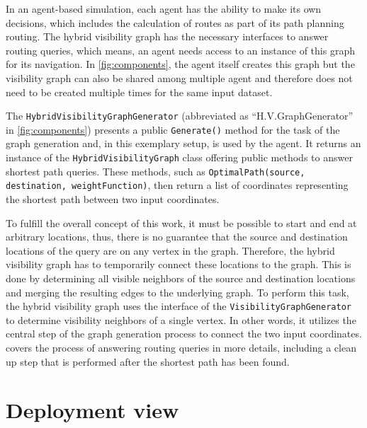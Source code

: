 	In an agent-based simulation, each agent has the ability to make its own decisions, which includes the calculation of routes as part of its path planning routing.
	The hybrid visibility graph has the necessary interfaces to answer routing queries, which means, an agent needs access to an instance of this graph for its navigation.
	In \cref{fig:components}, the agent itself creates this graph but the visibility graph can also be shared among multiple agent and therefore does not need to be created multiple times for the same input dataset.
	
	The \texttt{HybridVisibilityGraphGenerator} (abbreviated as \enquote{H.V.GraphGenerator} in \cref{fig:components}) presents a public \texttt{Generate()} method for the task of the graph generation and, in this exemplary setup, is used by the agent.
	It returns an instance of the \texttt{HybridVisibilityGraph} class offering public methods to answer shortest path queries.
	These methods, such as \texttt{OptimalPath(source, destination, weightFunction)}, then return a list of coordinates representing the shortest path between two input coordinates.
	
	To fulfill the overall concept of this work, it must be possible to start and end at arbitrary locations, thus, there is no guarantee that the source and destination locations of the query are on any vertex in the graph.
	Therefore, the hybrid visibility graph has to temporarily connect these locations to the graph.
	This is done by determining all visible neighbors of the source and destination locations and merging the resulting edges to the underlying graph.
	To perform this task, the hybrid visibility graph uses the interface of the \texttt{VisibilityGraphGenerator} to determine visibility neighbors of a single vertex.
	In other words, it utilizes the central step of the graph generation process to connect the two input coordinates.
	 covers the process of answering routing queries in more details, including a clean up step that is performed after the shortest path has been found.

\section{Deployment view}


